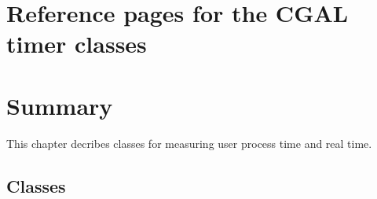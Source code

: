 
\ccParDims

\clearpage
\section{Reference pages for the CGAL timer classes}

\section*{Summary}

This chapter decribes classes for measuring user process time and real time.

\subsection*{Classes}
\\
\\
